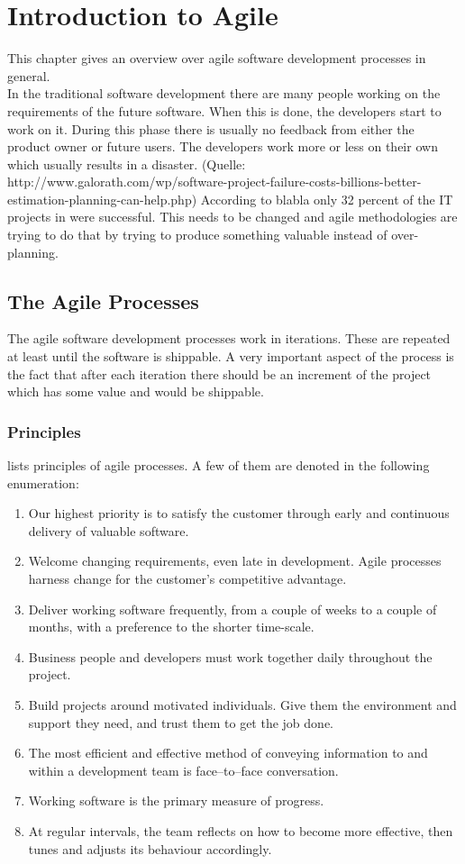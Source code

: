 \chapter{Introduction to Agile}
This chapter gives an overview over agile software development processes in general.\\

In the traditional software development there are many people working on the requirements of the future software. When this is done, the developers start to work on it. During this phase there is usually no feedback from either the product owner or future users. The developers work more or less on their own which usually results in a disaster. (Quelle: http://www.galorath.com/wp/software-project-failure-costs-billions-better-estimation-planning-can-help.php) According to blabla only 32 percent of the IT projects in were successful. This needs to be changed and agile methodologies are trying to do that by trying to produce something valuable instead of over-planning.

\section{The Agile Processes}
The agile software development processes work in iterations. These are repeated at least until the software is shippable. A very important aspect of the process is the fact that after each iteration there should be an increment of the project which has some value and would be shippable.

\subsection{Principles}
\cite{beck2001manifesto} lists principles of agile processes. A few of them are denoted in the following enumeration:
\begin{enumerate}
\item Our highest priority is to satisfy the customer through early and continuous delivery of valuable software.
\item Welcome changing requirements, even late in development. Agile processes harness change for the customer's competitive advantage. 
\item Deliver working software frequently, from a couple of weeks to a couple of months, with a preference to the shorter time-scale.
\item Business people and developers must work together daily throughout the project.
\item Build projects around motivated individuals. Give them the environment and support they need, and trust them to get the
job done.
\item The most efficient and effective method of conveying information to and within a development team is face–to–face conversation.
\item Working software is the primary measure of progress.
\item At regular intervals, the team reflects on how to become more effective, then tunes and adjusts its behaviour accordingly.
\end{enumerate}



